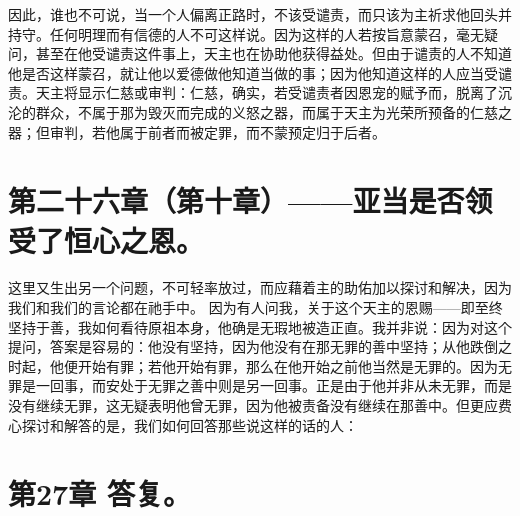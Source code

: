因此，谁也不可说，当一个人偏离正路时，不该受谴责，而只该为主祈求他回头并持守。任何明理而有信德的人不可这样说。因为这样的人若按旨意蒙召，毫无疑问，甚至在他受谴责这件事上，天主也在协助他获得益处。但由于谴责的人不知道他是否这样蒙召，就让他以爱德做他知道当做的事；因为他知道这样的人应当受谴责。天主将显示仁慈或审判：仁慈，确实，若受谴责者因恩宠的赋予而，脱离了沉沦的群众，不属于那为毁灭而完成的义怒之器，而属于天主为光荣所预备的仁慈之器；但审判，若他属于前者而被定罪，而不蒙预定归于后者。\par


\section{第二十六章（第十章）——亚当是否领受了恒心之恩。}

这里又生出另一个问题，不可轻率放过，而应藉着主的助佑加以探讨和解决，因为我们和我们的言论都在祂手中。 因为有人问我，关于这个天主的恩赐——即至终坚持于善，我如何看待原祖本身，他确是无瑕地被造正直。我并非说：因为对这个提问，答案是容易的：他没有坚持，因为他没有在那无罪的善中坚持；从他跌倒之时起，他便开始有罪；若他开始有罪，那么在他开始之前他当然是无罪的。因为无罪是一回事，而安处于无罪之善中则是另一回事。正是由于他并非从未无罪，而是没有继续无罪，这无疑表明他曾无罪，因为他被责备没有继续在那善中。但更应费心探讨和解答的是，我们如何回答那些说这样的话的人：\par


\section{第27章 答复。}

